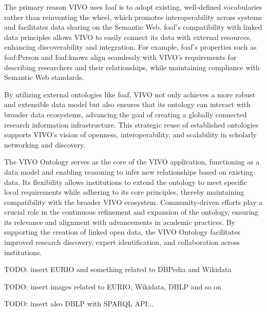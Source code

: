The primary reason VIVO uses \gls{foaf} is to adopt existing, well-defined vocabularies rather than reinventing the wheel, which promotes interoperability across systems and facilitates data sharing on the Semantic Web.
\gls{foaf}'s compatibility with linked data principles allows VIVO to easily connect its data with external resources, enhancing discoverability and integration.
For example, \gls{foaf}'s properties such as foaf:Person and foaf:knows align seamlessly with VIVO's requirements for describing researchers and their relationships, while maintaining compliance with Semantic Web standards.

By utilizing external ontologies like \gls{foaf}, VIVO not only achieves a more robust and extensible data model but also ensures that its ontology can interact with broader data ecosystems, advancing the goal of creating a globally connected research information infrastructure.
This strategic reuse of established ontologies supports VIVO's vision of openness, interoperability, and scalability in scholarly networking and discovery.

The VIVO Ontology serves as the core of the VIVO application, functioning as a data model and enabling reasoning to infer new relationships based on existing data.
Its flexibility allows institutions to extend the ontology to meet specific local requirements while adhering to its core principles, thereby maintaining compatibility with the broader VIVO ecosystem.
Community-driven efforts play a crucial role in the continuous refinement and expansion of the ontology, ensuring its relevance and alignment with advancements in academic practices.
By supporting the creation of linked open data, the VIVO Ontology facilitates improved research discovery, expert identification, and collaboration across institutions.

TODO: insert EURIO and something related to DBPedia and Wikidata

TODO: insert images related to EURIO, Wikidata, DBLP and so on

TODO: insert also DBLP with SPARQL API...


 
